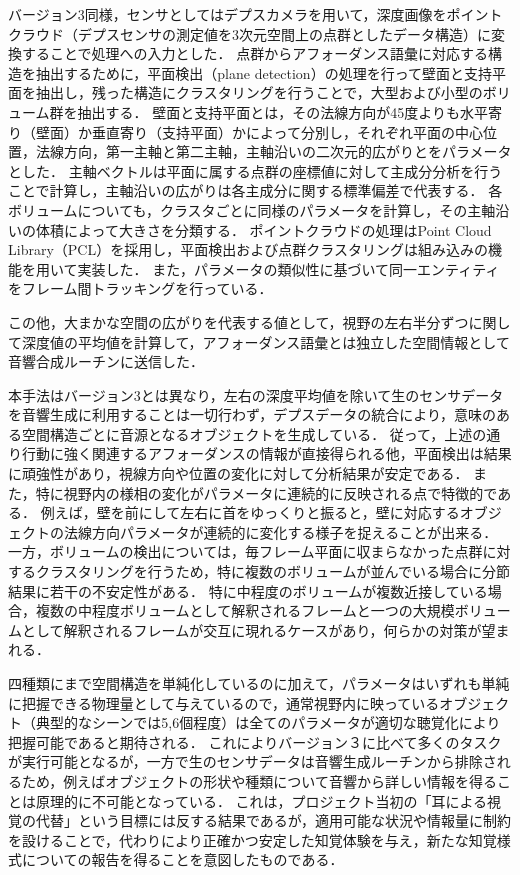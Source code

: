 バージョン3同様，センサとしてはデプスカメラを用いて，深度画像をポイントクラウド（デプスセンサの測定値を3次元空間上の点群としたデータ構造）に変換することで処理への入力とした．
点群からアフォーダンス語彙に対応する構造を抽出するために，平面検出（plane detection）の処理を行って壁面と支持平面を抽出し，残った構造にクラスタリングを行うことで，大型および小型のボリューム群を抽出する．
壁面と支持平面とは，その法線方向が45度よりも水平寄り（壁面）か垂直寄り（支持平面）かによって分別し，それぞれ平面の中心位置，法線方向，第一主軸と第二主軸，主軸沿いの二次元的広がりとをパラメータとした．
主軸ベクトルは平面に属する点群の座標値に対して主成分分析を行うことで計算し，主軸沿いの広がりは各主成分に関する標準偏差で代表する．
各ボリュームについても，クラスタごとに同様のパラメータを計算し，その主軸沿いの体積によって大きさを分類する．
ポイントクラウドの処理はPoint Cloud Library（PCL）を採用し，平面検出および点群クラスタリングは組み込みの機能を用いて実装した．
また，パラメータの類似性に基づいて同一エンティティをフレーム間トラッキングを行っている．

この他，大まかな空間の広がりを代表する値として，視野の左右半分ずつに関して深度値の平均値を計算して，アフォーダンス語彙とは独立した空間情報として音響合成ルーチンに送信した．

本手法はバージョン3とは異なり，左右の深度平均値を除いて生のセンサデータを音響生成に利用することは一切行わず，デプスデータの統合により，意味のある空間構造ごとに音源となるオブジェクトを生成している．
従って，上述の通り行動に強く関連するアフォーダンスの情報が直接得られる他，平面検出は結果に頑強性があり，視線方向や位置の変化に対して分析結果が安定である．
また，特に視野内の様相の変化がパラメータに連続的に反映される点で特徴的である．
例えば，壁を前にして左右に首をゆっくりと振ると，壁に対応するオブジェクトの法線方向パラメータが連続的に変化する様子を捉えることが出来る．
一方，ボリュームの検出については，毎フレーム平面に収まらなかった点群に対するクラスタリングを行うため，特に複数のボリュームが並んでいる場合に分節結果に若干の不安定性がある．
特に中程度のボリュームが複数近接している場合，複数の中程度ボリュームとして解釈されるフレームと一つの大規模ボリュームとして解釈されるフレームが交互に現れるケースがあり，何らかの対策が望まれる．

四種類にまで空間構造を単純化しているのに加えて，パラメータはいずれも単純に把握できる物理量として与えているので，通常視野内に映っているオブジェクト（典型的なシーンでは5,6個程度）は全てのパラメータが適切な聴覚化により把握可能であると期待される．
これによりバージョン３に比べて多くのタスクが実行可能となるが，一方で生のセンサデータは音響生成ルーチンから排除されるため，例えばオブジェクトの形状や種類について音響から詳しい情報を得ることは原理的に不可能となっている．
これは，プロジェクト当初の「耳による視覚の代替」という目標には反する結果であるが，適用可能な状況や情報量に制約を設けることで，代わりにより正確かつ安定した知覚体験を与え，新たな知覚様式についての報告を得ることを意図したものである．

